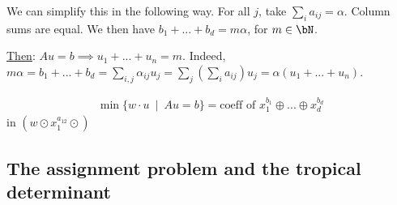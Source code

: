 We can simplify this in the following way. For all $j$, take $\sum_{i}a_{ij} = \alpha$. Column sums are equal. We then have $b_1 + ... + b_d = m\alpha$, for $m\in \bN$.

\underline{Then}: $Au = b \implies u_1 + ... + u_n = m$. Indeed, $m\alpha = b_1 + ... + b_d = \sum_{i,j} \alpha_{ij}u_j = \sum_{j}(\sum_{i}a_{ij})u_j = \alpha(u_1+...+u_n)$.

\begin{prop}\label{prop:sol-via-tropical}
  \begin{align*}
    \min\{w\cdot u ~\mid~ Au = b\} = \text{coeff of } x_1^{b_1}\oplus ... \oplus x_d^{b_d}
  \end{align*}
  in $(w\odot x_1^{a_{12}} \odot )$
\end{prop}
\subsection{The assignment problem and the tropical determinant}
\printbibliography

